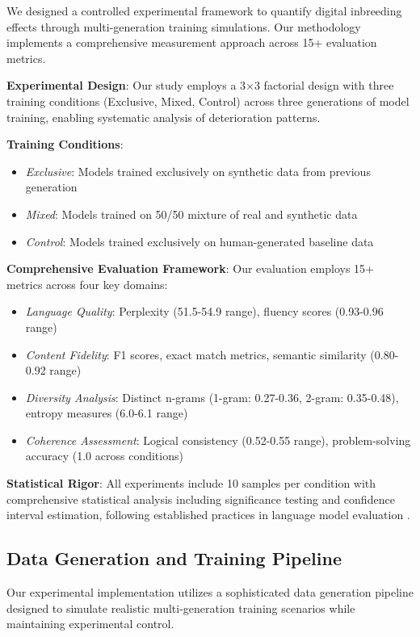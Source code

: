 \documentclass{article}
\begin{document}
We designed a controlled experimental framework to quantify digital inbreeding effects through multi-generation training simulations. Our methodology implements a comprehensive measurement approach across 15+ evaluation metrics.

\textbf{Experimental Design}: Our study employs a 3×3 factorial design with three training conditions (Exclusive, Mixed, Control) across three generations of model training, enabling systematic analysis of deterioration patterns.

\textbf{Training Conditions}: 
\begin{itemize}
\item \textit{Exclusive}: Models trained exclusively on synthetic data from previous generation
\item \textit{Mixed}: Models trained on 50/50 mixture of real and synthetic data
\item \textit{Control}: Models trained exclusively on human-generated baseline data
\end{itemize}

\textbf{Comprehensive Evaluation Framework}:
Our evaluation employs 15+ metrics across four key domains:
\begin{itemize}
\item \textit{Language Quality}: Perplexity (51.5-54.9 range), fluency scores (0.93-0.96 range)
\item \textit{Content Fidelity}: F1 scores, exact match metrics, semantic similarity (0.80-0.92 range)
\item \textit{Diversity Analysis}: Distinct n-grams (1-gram: 0.27-0.36, 2-gram: 0.35-0.48), entropy measures (6.0-6.1 range)
\item \textit{Coherence Assessment}: Logical consistency (0.52-0.55 range), problem-solving accuracy (1.0 across conditions)
\end{itemize}

\textbf{Statistical Rigor}: All experiments include 10 samples per condition with comprehensive statistical analysis including significance testing and confidence interval estimation, following established practices in language model evaluation \cite{brown2020language, touvron2023llama}.

\subsection{Data Generation and Training Pipeline}

Our experimental implementation utilizes a sophisticated data generation pipeline designed to simulate realistic multi-generation training scenarios while maintaining experimental control.
\end{document}
